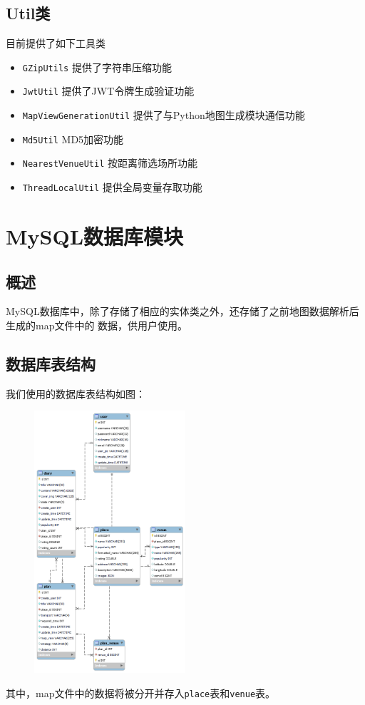 \documentclass{report}
\begin{document}
\subsection{Util类}
目前提供了如下工具类
\begin{itemize}
    \item \verb|GZipUtils| 提供了字符串压缩功能
    \item \verb|JwtUtil| 提供了JWT令牌生成验证功能
    \item \verb|MapViewGenerationUtil| 提供了与Python地图生成模块通信功能
    \item \verb|Md5Util| MD5加密功能
    \item \verb|NearestVenueUtil| 按距离筛选场所功能
    \item \verb|ThreadLocalUtil| 提供全局变量存取功能
\end{itemize}

\section{MySQL数据库模块}
\subsection{概述}
MySQL数据库中，除了存储了相应的实体类之外，还存储了之前地图数据解析后生成的map文件中的
数据，供用户使用。
\subsection{数据库表结构}
我们使用的数据库表结构如图：
\begin{figure}[h]
    \begin{center}
        \includegraphics*[width=0.5\textwidth]{figure/db.png}
    \end{center}
    
\end{figure}
\par
其中，map文件中的数据将被分开并存入\verb|place|表和\verb|venue|表。
\end{document}
